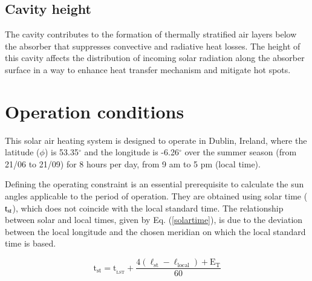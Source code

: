     
\subsection{Cavity height}
The cavity contributes to the formation of thermally stratified air layers below the absorber that suppresses convective and radiative heat losses. The height of this cavity affects the distribution of incoming solar radiation along the absorber surface in a way to enhance heat transfer mechanism and mitigate hot spots.

\section{Operation conditions}

This solar air heating system is designed to operate in Dublin, Ireland, where the latitude ($\phi$) is 53.35$^{\circ}$ and the longitude is -6.26$^{\circ}$ over the summer season (from 21/06 to 21/09) for 8 hours per day, from 9 am to 5 pm (local time).

Defining the operating constraint is an essential prerequisite to calculate the sun angles applicable to the period of operation. They are obtained using solar time ($\rm{t_{st}}$), which does not coincide with the local standard time. The relationship between solar and local times, given by Eq. (\ref{solartime}), is due to the deviation between the local longitude and the chosen meridian on which the local standard time is based.

\begin{equation}
    \mathrm{t_{st} = t_{\!_{LST}} + \frac{4(\ell_{st} - \ell_{local}) + E_T}{60}}
    \label{solartime}
\end{equation}

